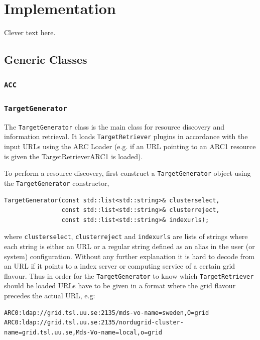 \documentclass{book}
\newcommand{\ACC}{\texttt{ACC}}
\newcommand{\TargetGenerator}{\texttt{TargetGenerator}}
\newcommand{\TargetRetriever}{\texttt{TargetRetriever}}
\begin{document}
\chapter{Implementation}
\label{sec:Implementation}
Clever text here.
\section{Generic Classes}
\subsection{{\ACC}}

\subsection{{\TargetGenerator}} The {\TargetGenerator} class is the main class for resource discovery and information retrieval. It loads 
{\TargetRetriever} plugins in accordance with the input URLs using the ARC Loader (e.g. if an URL pointing to an ARC1 resource is given 
the TargetRetrieverARC1 is loaded).

To perform a resource discovery, first construct a {\TargetGenerator} object using the {\TargetGenerator} constructor,

\begin{shaded}
\begin{verbatim}
TargetGenerator(const std::list<std::string>& clusterselect,
                const std::list<std::string>& clusterreject,
                const std::list<std::string>& indexurls);
\end{verbatim}
\end{shaded}

where \texttt{clusterselect}, \texttt{clusterreject} and \texttt{indexurls} are lists of strings where each string is either 
an URL or a regular string defined as an alias in the user (or system) configuration. Without any further explanation it is 
hard to decode from an URL if it points to a index server or computing service of a certain grid flavour. Thus in order for 
the {\TargetGenerator} to know which {\TargetRetriever} should be loaded URLs have to be given in a format where the grid 
flavour precedes the actual URL, e.g:

\begin{shaded}
\begin{small}
\begin{verbatim}
ARC0:ldap://grid.tsl.uu.se:2135/mds-vo-name=sweden,O=grid
ARC0:ldap://grid.tsl.uu.se:2135/nordugrid-cluster-name=grid.tsl.uu.se,Mds-Vo-name=local,o=grid
\end{verbatim}
\end{small}
\end{shaded}
\end{document}
